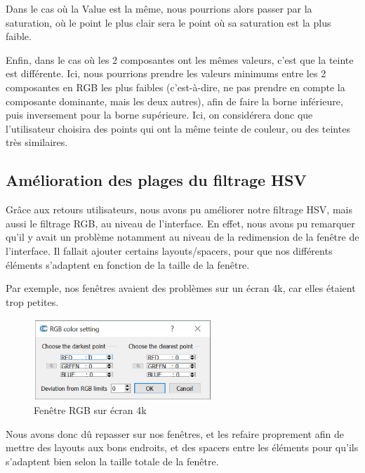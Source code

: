 \documentclass[12pt,titlepage,french]{article}
\begin{document}
Dans le cas où la Value est la même, nous pourrions alors passer par la saturation, où le point le plus clair sera le point où sa saturation est la plus faible. \newline

Enfin, dans le cas où les 2 composantes ont les mêmes valeurs, c'est que la teinte est différente. Ici, nous pourrions prendre les valeurs minimums entre les 2 composantes en RGB les plus faibles (c'est-à-dire, ne pas prendre en compte la composante dominante, mais les deux autres), afin de faire la borne inférieure, puis inversement pour la borne supérieure. Ici, on considérera donc que l'utilisateur choisira des points qui ont la même teinte de couleur, ou des teintes très similaires.

\subsection{Amélioration des plages du filtrage HSV}

Grâce aux retours utilisateurs, nous avons pu améliorer notre filtrage HSV, mais aussi le filtrage RGB, au niveau de l'interface. En effet, nous avons pu remarquer qu'il y avait un problème notamment au niveau de la redimension de la fenêtre de l'interface. Il fallait ajouter certains layouts/spacers, pour que nos différents éléments s'adaptent en fonction de la taille de la fenêtre. 

Par exemple, nos fenêtres avaient des problèmes sur un écran 4k, car elles étaient trop petites.

\begin{figure}[H]
 \caption{\label{} Fenêtre RGB sur écran 4k}
 \begin{center}
 \includegraphics[width=0.6\textwidth]{./img/rgb_pb.PNG}
  \end{center}
\end{figure}

Nous avons donc dû repasser sur nos fenêtres, et les refaire proprement afin de mettre des layouts aux bons endroits, et des spacers entre les éléments pour qu'ils s'adaptent bien selon la taille totale de la fenêtre.
\end{document}
